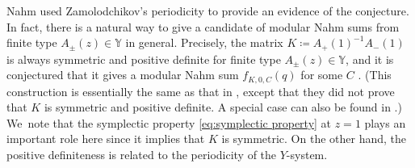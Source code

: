 \documentclass[10pt,a4paper]{amsart}
\numberwithin{equation}{section}
\theoremstyle{definition}
\begin{document}
Nahm used Zamolodchikov's periodicity to provide an evidence of the conjecture.
In fact, there is a natural way to give a candidate of modular Nahm sums from finite
type $A_\pm (z) \in \mathbb{Y}$ in general.
Precisely, the matrix $K \coloneqq A_{+}(1)^{-1} A_{-}(1)$ is
always symmetric and positive definite for finite type $A_\pm (z) \in \mathbb{Y}$,
and it is conjectured that it gives a modular Nahm sum $f_{K, 0, C} (q)$ for some $C$ \cite{mizuno2020difference}.
(This construction is essentially the same as that in \cite{KatoTerashima}, except that they did not prove
that $K$ is symmetric and positive definite. A special case can also be found in \cite{Lee}.)
We~note that the symplectic property \eqref{eq:symplectic property} at $z=1$ plays an important role
here since it implies that $K$ is symmetric.
On the other hand, the positive definiteness is related to the periodicity of the $Y$-system.
\end{document}
